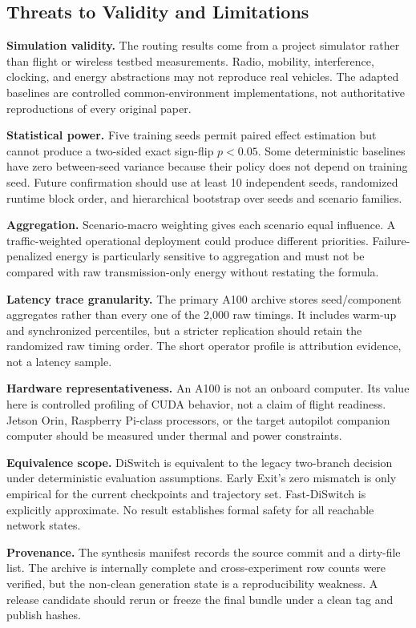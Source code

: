 \documentclass{ieeeaccess}
\newcommand{\DS}{DiSwitch}
\newcommand{\FastDS}{Fast-DiSwitch}
\begin{document}
\subsection{Threats to Validity and Limitations}

\textbf{Simulation validity.} The routing results come from a project simulator rather than flight or wireless testbed measurements. Radio, mobility, interference, clocking, and energy abstractions may not reproduce real vehicles. The adapted baselines are controlled common-environment implementations, not authoritative reproductions of every original paper.

\textbf{Statistical power.} Five training seeds permit paired effect estimation but cannot produce a two-sided exact sign-flip $p<0.05$. Some deterministic baselines have zero between-seed variance because their policy does not depend on training seed. Future confirmation should use at least 10 independent seeds, randomized runtime block order, and hierarchical bootstrap over seeds and scenario families.

\textbf{Aggregation.} Scenario-macro weighting gives each scenario equal influence. A traffic-weighted operational deployment could produce different priorities. Failure-penalized energy is particularly sensitive to aggregation and must not be compared with raw transmission-only energy without restating the formula.

\textbf{Latency trace granularity.} The primary A100 archive stores seed/component aggregates rather than every one of the 2,000 raw timings. It includes warm-up and synchronized percentiles, but a stricter replication should retain the randomized raw timing order. The short operator profile is attribution evidence, not a latency sample.

\textbf{Hardware representativeness.} An A100 is not an onboard computer. Its value here is controlled profiling of CUDA behavior, not a claim of flight readiness. Jetson Orin, Raspberry Pi-class processors, or the target autopilot companion computer should be measured under thermal and power constraints.

\textbf{Equivalence scope.} \DS{} is equivalent to the legacy two-branch decision under deterministic evaluation assumptions. Early Exit's zero mismatch is only empirical for the current checkpoints and trajectory set. \FastDS{} is explicitly approximate. No result establishes formal safety for all reachable network states.

\textbf{Provenance.} The synthesis manifest records the source commit and a dirty-file list. The archive is internally complete and cross-experiment row counts were verified, but the non-clean generation state is a reproducibility weakness. A release candidate should rerun or freeze the final bundle under a clean tag and publish hashes.
\end{document}
